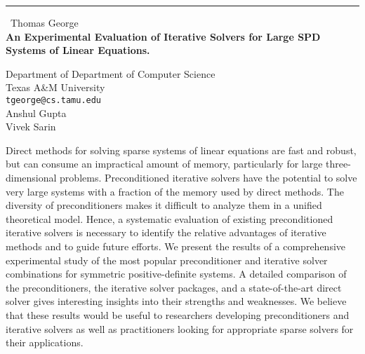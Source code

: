 \documentclass{report}
\begin{document}
\begin{center}
\rule{6in}{1pt} \
{\large Thomas George \\
{\bf An Experimental Evaluation of Iterative Solvers for Large SPD Systems
of Linear Equations.
}}

Department of Department of Computer Science \\ 
Texas A&M University  
\\
{\tt tgeorge@cs.tamu.edu}\\
Anshul Gupta \\
Vivek Sarin
\end{center}

Direct methods for solving sparse systems of linear equations are
fast and robust, but can consume an impractical amount of memory,
particularly for large three-dimensional problems. Preconditioned
iterative solvers have the potential to solve very large systems with
a fraction of the memory used by direct methods. The diversity of
preconditioners makes it difficult to analyze them in a unified
theoretical model. Hence, a systematic evaluation of existing
preconditioned iterative solvers is necessary to identify the relative
advantages of iterative methods and to guide future efforts.
We present the results of a comprehensive experimental 
study of the most popular preconditioner and iterative solver
combinations for symmetric positive-definite systems. A detailed
comparison of the preconditioners, the iterative solver packages, and a
state-of-the-art direct solver gives interesting insights into their
strengths and weaknesses. We believe that these results would be
useful to researchers developing preconditioners and iterative solvers
as well as practitioners looking for appropriate sparse solvers for
their applications.
\end{document}
